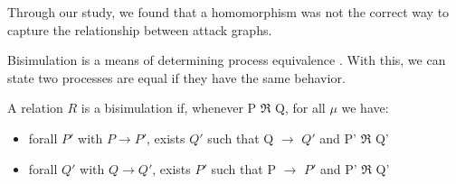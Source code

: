 Through our study, we found that a homomorphism was not the correct way to capture the relationship between attack graphs. 


Bisimulation is a means of determining process equivalence \cite{sangiorgi_2011}. With this, we can state two processes are equal if they have the same behavior. 

\begin{definition}[Bisimulation]
    A relation $R$ is a bisimulation if, whenever P $\Re$ Q, for all $\mu$ we have: 
    \begin{itemize}
        \item forall $P'$ with $P \rightarrow P'$, exists $Q'$ such that Q $\rightarrow$ $Q'$ and P' $\Re$ Q'
        \item forall $Q'$ with $Q \rightarrow Q'$, exists $P'$ such that P $\rightarrow$ $P'$ and P' $\Re$ Q'
    \end{itemize}
    
\end{definition}



\begin{definition}
    
\end{definition}



